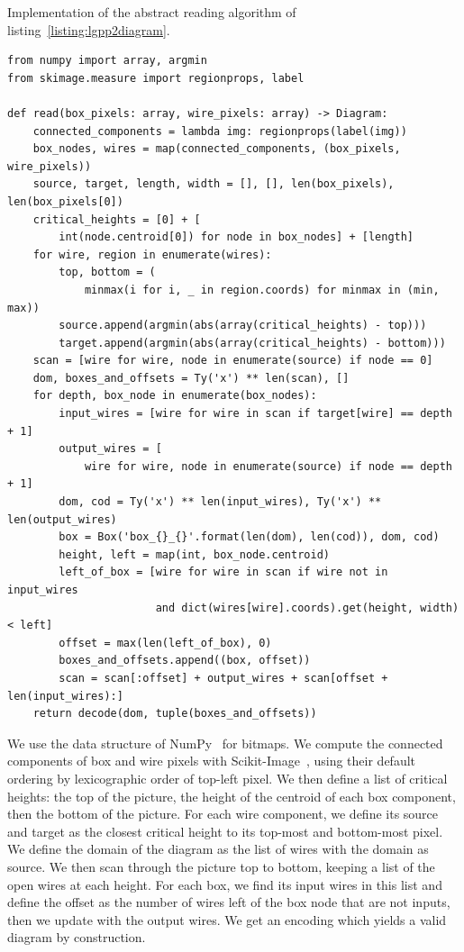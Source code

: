 \begin{python}
{\normalfont Implementation of the abstract reading algorithm of listing~\ref{listing:lgpp2diagram}.}

\begin{verbatim}
from numpy import array, argmin
from skimage.measure import regionprops, label

def read(box_pixels: array, wire_pixels: array) -> Diagram:
    connected_components = lambda img: regionprops(label(img))
    box_nodes, wires = map(connected_components, (box_pixels, wire_pixels))
    source, target, length, width = [], [], len(box_pixels), len(box_pixels[0])
    critical_heights = [0] + [
        int(node.centroid[0]) for node in box_nodes] + [length]
    for wire, region in enumerate(wires):
        top, bottom = (
            minmax(i for i, _ in region.coords) for minmax in (min, max))
        source.append(argmin(abs(array(critical_heights) - top)))
        target.append(argmin(abs(array(critical_heights) - bottom)))
    scan = [wire for wire, node in enumerate(source) if node == 0]
    dom, boxes_and_offsets = Ty('x') ** len(scan), []
    for depth, box_node in enumerate(box_nodes):
        input_wires = [wire for wire in scan if target[wire] == depth + 1]
        output_wires = [
            wire for wire, node in enumerate(source) if node == depth + 1]
        dom, cod = Ty('x') ** len(input_wires), Ty('x') ** len(output_wires)
        box = Box('box_{}_{}'.format(len(dom), len(cod)), dom, cod)
        height, left = map(int, box_node.centroid)
        left_of_box = [wire for wire in scan if wire not in input_wires
                       and dict(wires[wire].coords).get(height, width) < left]
        offset = max(len(left_of_box), 0)
        boxes_and_offsets.append((box, offset))
        scan = scan[:offset] + output_wires + scan[offset + len(input_wires):]
    return decode(dom, tuple(boxes_and_offsets))
\end{verbatim}
\end{python}

We use the  data structure of NumPy~\cite{VanDerWaltEtAl11} for bitmaps.
We compute the connected components of box and wire pixels with Scikit-Image~\cite{WaltEtAl14}, using their default ordering by lexicographic order of top-left pixel.
We then define a list of critical heights: the top of the picture, the height of the centroid of each box component, then the bottom of the picture.
For each wire component, we define its source and target as the closest critical height to its top-most and bottom-most pixel.
We define the domain of the diagram as the list of wires with the domain as source.
We then scan through the picture top to bottom, keeping a list  of the open wires at each height.
For each box, we find its input wires in this list and define the offset as the number of wires left of the box node that are not inputs, then we update  with the output wires.
We get an encoding  which yields a valid diagram by construction.

